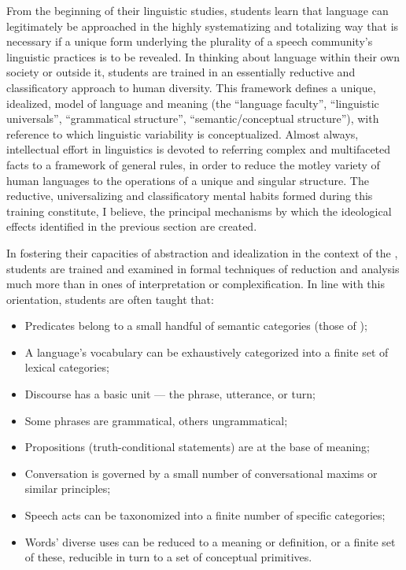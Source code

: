 \documentclass[output=paper]{langscibook}
\begin{document}
From the beginning of their linguistic studies, students learn that language can legitimately be approached in the highly systematizing and totalizing way that is necessary if a unique form underlying the plurality of a speech community's linguistic practices is to be revealed. In thinking about language within their own society or outside it, students are trained in an essentially reductive and classificatory approach to human diversity. This framework defines a unique, idealized,  model of language and meaning (the ``language faculty'', ``linguistic universals'', ``grammatical structure'', ``semantic/conceptual structure''), with reference to which linguistic variability is conceptualized. Almost always, intellectual effort in linguistics is devoted to referring complex and multifaceted facts to a framework of general rules, in order to reduce the motley variety of human languages to the operations of a unique and singular structure. The reductive, universalizing and classificatory mental habits formed during this training constitute, I believe, the principal mechanisms by which the ideological effects identified in the previous section are created.

In fostering their capacities of abstraction and idealization in the context of the , students are trained and examined in formal techniques of reduction and analysis much more than in  ones of interpretation or complexification. In line with this orientation, students are often taught that:

\begin{itemize}
    \item Predicates belong to a small handful of semantic categories (those of \citealt{Vendler1957});
    \item A language's vocabulary can be exhaustively categorized into a finite set of lexical categories;
    \item Discourse has a basic unit — the phrase, utterance, or turn;
    \item Some phrases are grammatical, others ungrammatical;
    \item Propositions (truth-conditional statements) are at the base of meaning;
    \item Conversation is governed by a small number of conversational maxims or similar principles;
    \item Speech acts can be taxonomized into a finite number of specific categories;
    \item Words' diverse uses can be reduced to a meaning or definition, or a finite set of these, reducible in turn to a set of conceptual primitives.
\end{itemize}
\end{document}
